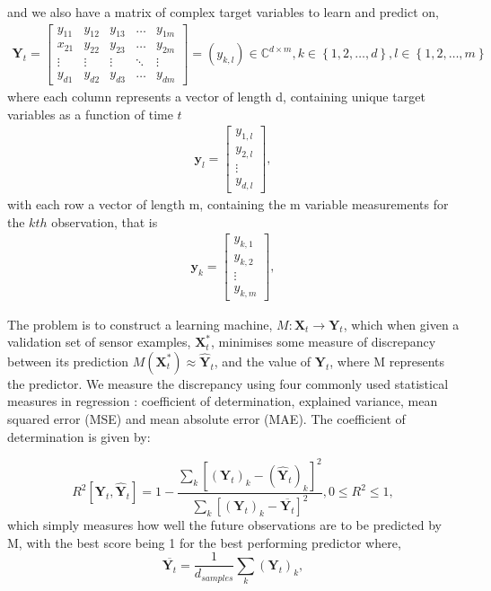 and we also have a matrix of complex target variables to learn and predict on,
\begin{align*}
\textbf{Y}_{t}=\begin{bmatrix}
    y_{11} & y_{12} & y_{13} & \dots  & y_{1m} \\
    x_{21} & y_{22} & y_{23} & \dots  & y_{2m} \\
    \vdots & \vdots & \vdots & \ddots & \vdots \\
    y_{d1} & y_{d2} & y_{d3} & \dots  & y_{dm}
\end{bmatrix}=(y_{k,l}) \in  \mathbb{C}^{d \times m},  k\in \left\{1,2,\dots, d\right\}, l \in \left\{1,2,\dots,m\right\}
\end{align*}
where each column represents a vector of length d, containing unique target variables as a function of time $t$
\begin{align*}
\textbf{y}_{l}=\begin{bmatrix}
    y_{1,l}  \\
    y_{2,l} \\
    \vdots \\
    y_{d,l} 
\end{bmatrix},
\end{align*} 
with each row a vector of length m, containing the m variable measurements for the $kth$ observation, that is 
\begin{align*}
\textbf{y}_k=\begin{bmatrix}
    y_{k,1}  \\
    y_{k,2} \\
    \vdots \\
    y_{k,m} 
\end{bmatrix},
\end{align*}
 
The problem is to construct a learning machine, $M:\textbf{X}_{t} \rightarrow \textbf{Y}_{t}$, which when given a validation set of sensor examples, $\textbf{X}^*_{t}$, minimises some measure of discrepancy between its prediction $M(\textbf{X}^*_{t})\approx\widehat{\textbf{Y}}_{t}$, and the value of $\textbf{Y}_{t}$, where M represents the predictor. We measure the discrepancy using four commonly used statistical measures in regression \citep{borchani2015survey}: coefficient of determination, explained variance, mean squared error (MSE) and mean absolute error (MAE). The coefficient of determination is given by:

\begin{equation}
R^2\left[\textbf{Y}_{t},\widehat{\textbf{Y}}_{t}\right]=1-\frac{\sum_{k} \left[(\textbf{Y}_{t})_{k}-(\widehat{\textbf{Y}}_{t})_{k}\right]^2}{\sum_{k}\left[(\textbf{Y}_{t})_{k}-\overline{\textbf{Y}_{t}}\right]^2}, 0 \leq R^2 \leq 1,
\label{R2score}
\end{equation}
which simply measures how well the future observations are to be predicted by M, with the best score being 1 for the best performing predictor 
where,  \begin{equation}
\overline{\textbf{Y}_{t}}=\frac{1}{d_{samples}} \sum_{k} (\textbf{Y}_{t})_{k},
\end{equation} 

